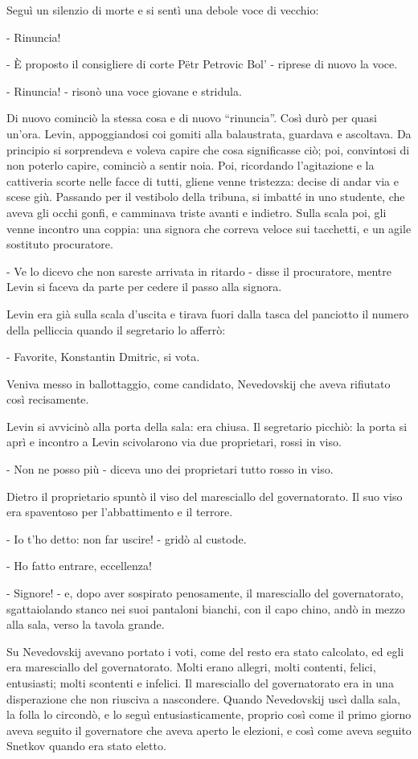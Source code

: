 Seguì un silenzio di morte e si sentì una debole voce di vecchio: 

- Rinuncia! 

- È proposto il consigliere di corte Pëtr Petrovic Bol' - riprese di nuovo la voce. 

- Rinuncia! - risonò una voce giovane e stridula. 

Di nuovo cominciò la stessa cosa e di nuovo ``rinuncia''. Così durò per quasi un'ora. Levin, appoggiandosi coi gomiti alla balaustrata, guardava e ascoltava. Da principio si sorprendeva e voleva capire che cosa significasse ciò; poi, convintosi di non poterlo capire, cominciò a sentir noia. Poi, ricordando l'agitazione e la cattiveria scorte nelle facce di tutti, gliene venne tristezza: decise di andar via e scese giù. Passando per il vestibolo della tribuna, si imbatté in uno studente, che aveva gli occhi gonfi, e camminava triste avanti e indietro. Sulla scala poi, gli venne incontro una coppia: una signora che correva veloce sui tacchetti, e un agile sostituto procuratore. 

- Ve lo dicevo che non sareste arrivata in ritardo - disse il procuratore, mentre Levin si faceva da parte per cedere il passo alla signora. 

Levin era già sulla scala d'uscita e tirava fuori dalla tasca del panciotto il numero della pelliccia quando il segretario lo afferrò: 

- Favorite, Konstantin Dmitric, si vota. 

Veniva messo in ballottaggio, come candidato, Nevedovskij che aveva rifiutato così recisamente. 

Levin si avvicinò alla porta della sala: era chiusa. Il segretario picchiò: la porta si aprì e incontro a Levin scivolarono via due proprietari, rossi in viso. 

- Non ne posso più - diceva uno dei proprietari tutto rosso in viso. 

Dietro il proprietario spuntò il viso del maresciallo del governatorato. Il suo viso era spaventoso per l'abbattimento e il terrore. 

- Io t'ho detto: non far uscire! - gridò al custode. 

- Ho fatto entrare, eccellenza! 

- Signore! - e, dopo aver sospirato penosamente, il maresciallo del governatorato, sgattaiolando stanco nei suoi pantaloni bianchi, con il capo chino, andò in mezzo alla sala, verso la tavola grande. 

Su Nevedovskij avevano portato i voti, come del resto era stato calcolato, ed egli era maresciallo del governatorato. Molti erano allegri, molti contenti, felici, entusiasti; molti scontenti e infelici. Il maresciallo del governatorato era in una disperazione che non riusciva a nascondere. Quando Nevedovskij uscì dalla sala, la folla lo circondò, e lo seguì entusiasticamente, proprio così come il primo giorno aveva seguito il governatore che aveva aperto le elezioni, e così come aveva seguito Snetkov quando era stato eletto. 

